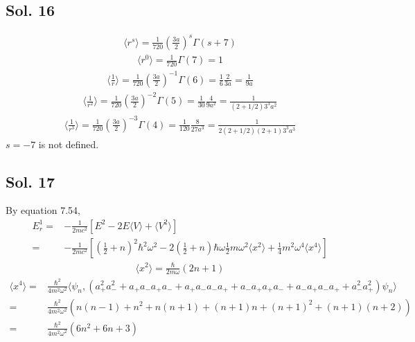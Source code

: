 \subsection*{Sol. 16}
\begin{align*}
    \langle r^s\rangle=\frac{1}{720}
                \left(
                \frac{3a}{2}
                \right)^s
                \Gamma(s+7)
\end{align*}
\begin{align*}
    \langle r^0\rangle = \frac{1}{720}
                \Gamma(7) = 1
\end{align*}
\begin{align*}
    \langle\frac{1}{r}\rangle = 
    \frac{1}{720}
                \left(
                \frac{3a}{2}
                \right)^{-1}
                \Gamma(6) = \frac{1}{6}\frac{2}{3a}=\frac{1}{9a}
\end{align*}
\begin{align*}
    \langle\frac{1}{r^2}\rangle = 
    \frac{1}{720}
                \left(
                \frac{3a}{2}
                \right)^{-2}
                \Gamma(5) = \frac{1}{30}\frac{4}{9a^2}=\frac{1}{(2+1/2)3^3a^2}
\end{align*}
\begin{align*}
    \langle\frac{1}{r^3}\rangle = 
    \frac{1}{720}
                \left(
                \frac{3a}{2}
                \right)^{-3}
                \Gamma(4) = \frac{1}{120}\frac{8}{27a^3}=\frac{1}{2(2+1/2)(2+1)3^3a^3}
\end{align*}
$s=-7$ is not defined.

\subsection*{Sol. 17}
By equation 7.54,
\begin{align*}
    E^1_r = &  
    -\frac{1}{2mc^2}[E^2-2E\langle V\rangle +\langle V^2\rangle]\\
    =&
    -\frac{1}{2mc^2}[(\frac{1}{2}+n)^2\hbar^2\omega^2-2(\frac{1}{2}+n)\hbar\omega\frac{1}{2}m\omega^2\langle x^2\rangle +\frac{1}{4}m^2\omega^4\langle x^4\rangle]
\end{align*}
\begin{align*}
    \langle x^2\rangle =\frac{\hbar}{2m\omega}(2n+1)
\end{align*}
\begin{align*}
    \langle x^4\rangle =&
    \frac{\hbar^2}{4m^2\omega^2}\langle
    \psi_n, (a_+^2a_-^2 + a_+a_-a_+a_- + a_+a_-a_-a_+ + a_-a_+a_+a_-+a_-a_+a_-a_++a_-^2a_+^2)\psi_n
    \rangle\\
    =&\frac{\hbar^2}{4m^2\omega^2}(n(n-1)+n^2+n(n+1)+(n+1)n+(n+1)^2 + (n+1)(n+2))\\
    =&\frac{\hbar^2}{4m^2\omega^2}(6n^2 + 6n + 3)
\end{align*}

